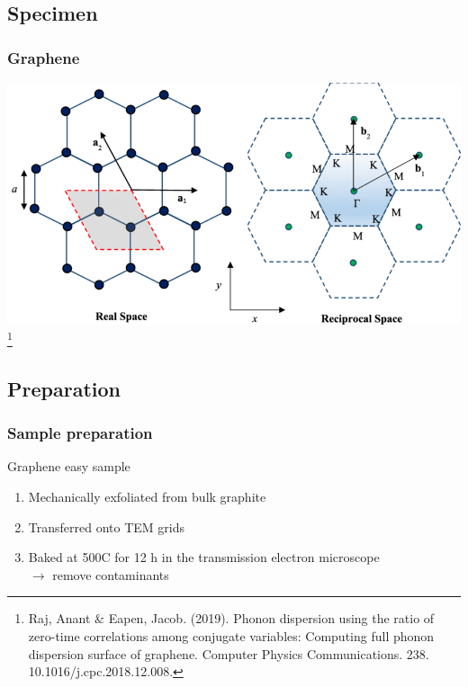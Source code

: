 \documentclass{beamer}
\begin{document}
\begin{frame}
	\section{Specimen}
	\frametitle{Graphene}
	\begin{minipage}{1\linewidth}
		\centering
		\includegraphics[width=0.9\linewidth, keepaspectratio]{Figures/graphene.png}
		\vfill
		\footnote{ \fontsize{4}{6}\selectfont Raj, Anant \& Eapen, Jacob. (2019). Phonon dispersion using the ratio of zero-time correlations among conjugate variables: Computing full phonon dispersion surface of graphene. Computer Physics Communications. 238. 10.1016/j.cpc.2018.12.008. }
	\end{minipage}
\end{frame}

\begin{frame}
	\subsection{Preparation}
	\frametitle{Sample preparation}
		Graphene easy sample
		\begin{enumerate}
			\item Mechanically exfoliated from bulk graphite
			\item Transferred onto TEM grids
			\item Baked at 500\textdegree C for 12 h in the transmission electron microscope\\ $\rightarrow$ remove contaminants
		\end{enumerate}
\end{frame}
\end{document}

